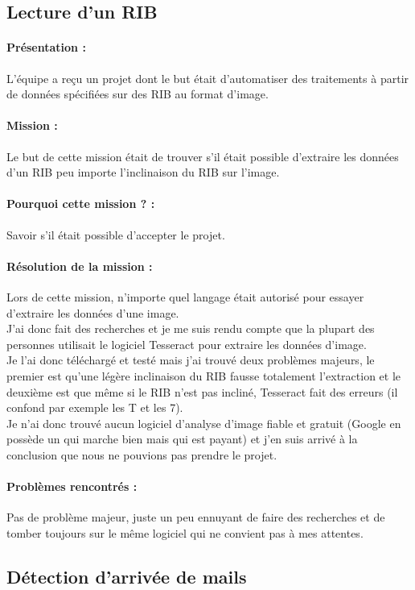 \documentclass[a4paper,twoside,12pt]{report}
\begin{document}
\subsection{Lecture d'un RIB}
\vspace{1cm}
\paragraph {Présentation :} 
L'équipe a reçu un projet dont le but était d'automatiser des traitements à partir de données spécifiées sur des RIB au format d'image.
\paragraph {Mission :}
Le but de cette mission était de trouver s'il était possible d'extraire les données d'un RIB peu importe l'inclinaison du RIB sur l'image.
\paragraph {Pourquoi cette mission ? :}
Savoir s'il était possible d'accepter le projet.
\paragraph {Résolution de la mission :}
Lors de cette mission, n'importe quel langage était autorisé pour essayer d'extraire les données d'une image.\\
J'ai donc fait des recherches et je me suis rendu compte que la plupart des personnes utilisait le logiciel Tesseract pour extraire les données d'image.\\
Je l'ai donc téléchargé et testé mais j'ai trouvé deux problèmes majeurs, le premier est qu'une légère inclinaison du RIB fausse totalement l'extraction et le deuxième est que même si le RIB n'est pas incliné, Tesseract fait des erreurs (il confond par exemple les T et les 7).\\
Je n'ai donc trouvé aucun logiciel d'analyse d'image fiable et gratuit (Google en possède un qui marche bien mais qui est payant) et j'en suis arrivé à la conclusion que nous ne pouvions pas prendre le projet.
\paragraph {Problèmes rencontrés :}
Pas de problème majeur, juste un peu ennuyant de faire des recherches et de tomber toujours sur le même logiciel qui ne convient pas à mes attentes.
\newpage
\subsection{Détection d'arrivée de mails}
\vspace{1cm}
\end{document}
